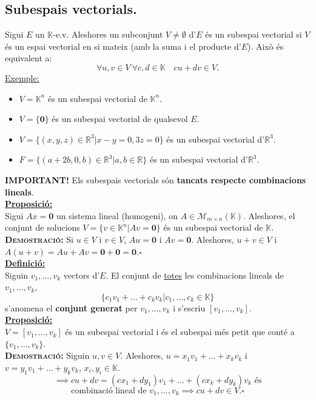\documentclass[11pt]{article}
\newcommand{\fieldk}{\mathbb{K}}
\newcommand{\definicio}{\underline{\textbf{Definició:}}\\}
\newcommand{\proposicio}{\underline{\textbf{Proposició:}}\\}
\newcommand{\demostracio}{\textbf{{\scshape Demostració: }}}
\newcommand{\ex}{\underline{Exemple:}}
\newcommand{\important}{\textbf{IMPORTANT! }}
\begin{document}
\subsection{Subespais vectorials.}
Sigui $E$ un $\fieldk$-e.v. Aleshores un subconjunt $V\neq\emptyset$ d'$E$ és un subespai vectorial si $V$ és un espai vectorial en si mateix (amb la suma i el producte d'$E$). Això és equivalent a:
$$\forall u,v\in V \ \forall c,d\in\fieldk \quad cu+dv\in V.$$
\ex \begin{itemize}
	\item $V=\fieldk^n$ és un subespai vectorial de $\fieldk^n$.
	\item $V=\{\textbf{0}\}$ és un subespai vectorial de qualsevol $E$.
	\item $V=\{(x,y,z)\in\mathbb{R}^3|x-y=0,3z=0\}$ és un subespai vectorial d'$\mathbb{R}^3$.
	\item $F=\{(a+2b,0,b)\in\mathbb{R}^3|a,b\in\mathbb{R}\}$ és un subespai vectorial d'$\mathbb{R}^3$.
\end{itemize}
\newpage
\noindent \important Els subespais vectorials són \textbf{tancats respecte combinacions lineals}.\\
\proposicio Sigui $Ax=\textbf{0}$ un sistema lineal (homogeni), on $A\in\mathcal{M}_{m\times n}(\fieldk)$. Aleshores, el conjunt de solucions $V=\{v\in\fieldk^n|Av=\textbf{0}\}$ és un subespai vectorial de $\fieldk$.\\
\demostracio Si $u\in V$ i $v\in V$, $Au=\textbf{0}$ i $Av=\textbf{0}$. Aleshores, $u+v\in V$ i $A(u+v)=Au+Av=\textbf{0}+\textbf{0}=\textbf{0}$.$\square$\\
\definicio Siguin $v_1,\ldots,v_k$ vectors d'$E$. El conjunt de \underline{totes} les combinacions lineals de $v_1,\ldots,v_k$,
$$\{c_1v_1+\ldots+c_kv_k|c_1,\ldots,c_k\in\fieldk\}$$
s'anomena el \textbf{conjunt generat} per $v_1,\ldots,v_k$ i s'escriu $[v_1,\ldots,v_k]$.\\
\proposicio $V=[v_1,\ldots,v_k]$ és un subespai vectorial i és el subespai més petit que conté a $\{v_1,\ldots,v_k\}$.\\
\demostracio Siguin $u,v\in V$. Aleshores, $u=x_1v_1+\ldots+x_kv_k$ i $v=y_1v_1+\ldots+y_kv_k$, $x_i,y_i\in\fieldk$.
$$\implies cu+dv=(cx_1+dy_1)v_1+\ldots+(cx_k+dy_k)v_k\textrm{ és}$$
$$\textrm{combinació lineal de }v_1,\ldots,v_k\implies cu+dv\in V.\square$$
\end{document}
